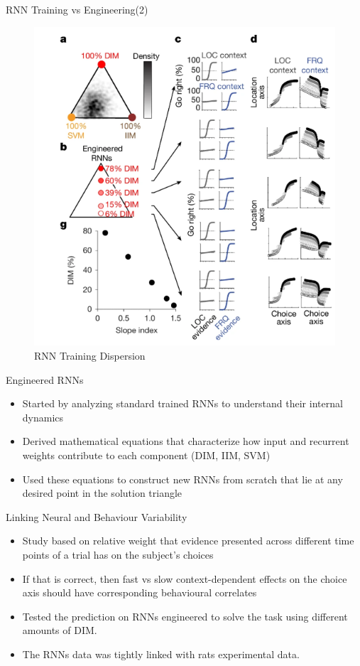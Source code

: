 \documentclass{beamer}
\begin{document}
\begin{frame}{RNN Training vs Engineering(2)}
    \begin{figure}
        \centering
        \includegraphics[width=0.5\linewidth]{rnn-cluster.png}
        \caption{RNN Training Dispersion}
        \label{fig:rnn-training}
    \end{figure}
\end{frame}

\begin{frame}{Engineered RNNs}
    \begin{itemize}
        \item Started by analyzing standard trained RNNs to understand their internal dynamics
        \item Derived mathematical equations that characterize how input and recurrent weights contribute to each component (DIM, IIM, SVM)
        \item Used these equations to construct new RNNs from scratch that lie at any desired point in the solution triangle
    \end{itemize}
\end{frame}

\begin{frame}{Linking Neural and Behaviour Variability}
    \begin{itemize}
        \item Study based on relative weight that evidence presented across different time points of a trial has on the subject's choices
        \item If that is correct, then fast vs slow context-dependent effects on the choice axis should have corresponding behavioural correlates
        \item Tested the prediction on RNNs engineered to solve the task using different amounts of DIM.
        \item The RNNs data was tightly linked with rats experimental data.
    \end{itemize}
\end{frame}
\end{document}
